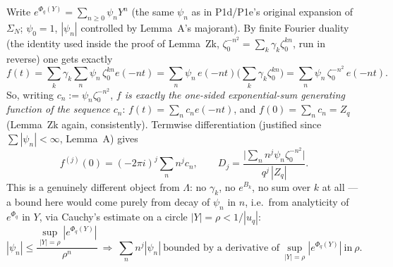 \documentclass[11pt]{article}
\theoremstyle{remark}\newtheorem{remark}[theorem]{Remark}
\begin{document}
Write $e^{\Phi_q(Y)}=\sum_{n\ge0}\psi_n Y^n$ (the same $\psi_n$ as in P1d/P1e's original expansion of $\Sigma_N$; $\psi_0=1$, $|\psi_n|$ controlled by Lemma~A's majorant). By finite Fourier duality (the identity used inside the proof of Lemma~Zk, $\zeta_0^{-n^2}=\sum_k\gamma_k\zeta_0^{kn}$, run in reverse) one gets exactly
\[
f(t)=\sum_k\gamma_k\sum_n\psi_n\,\zeta_0^{kn}e(-nt)=\sum_n\psi_n\,e(-nt)\Big(\sum_k\gamma_k\zeta_0^{kn}\Big)=\sum_n\psi_n\,\zeta_0^{-n^2}\,e(-nt).
\]
So, writing $c_n:=\psi_n\zeta_0^{-n^2}$, \emph{$f$ is exactly the one-sided exponential-sum generating function of the sequence $c_n$}: $f(t)=\sum_n c_n e(-nt)$, and $f(0)=\sum_n c_n=Z_q$ (Lemma~Zk again, consistently). Termwise differentiation (justified since $\sum|\psi_n|<\infty$, Lemma~A) gives
\[
f^{(j)}(0)=(-2\pi i)^j\sum_n n^j c_n,\qquad D_j=\frac{\big|\sum_n n^j\psi_n\zeta_0^{-n^2}\big|}{q^j\,|Z_q|}.
\]
This is a genuinely different object from $\Lambda$: no $\gamma_k$, no $e^{B_k}$, no sum over $k$ at all --- a bound here would come purely from decay of $\psi_n$ in $n$, i.e.\ from analyticity of $e^{\Phi_q}$ in $Y$, via Cauchy's estimate on a circle $|Y|=\rho<1/|u_q|$:
\[
|\psi_n|\le \frac{\sup_{|Y|=\rho}|e^{\Phi_q(Y)}|}{\rho^n}\ \Longrightarrow\ \sum_n n^j|\psi_n|\ \text{bounded by a derivative of}\ \sup_{|Y|=\rho}|e^{\Phi_q(Y)}|\ \text{in}\ \rho.
\]
\end{document}
